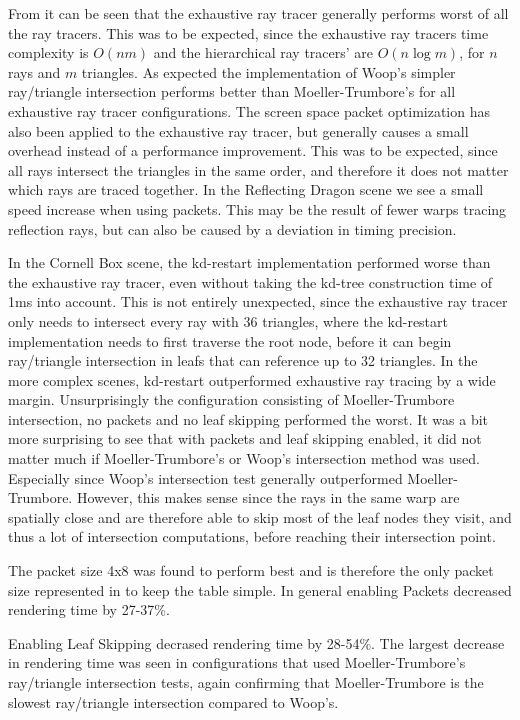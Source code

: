 From  it can be seen that the exhaustive ray
tracer generally performs worst of all the ray tracers. This was to be expected,
since the exhaustive ray tracers time complexity is $O(nm)$ and the hierarchical
ray tracers' are $O(n \log m)$, for $n$ rays and $m$ triangles. As expected the
implementation of Woop's simpler ray/triangle intersection performs better than
Moeller-Trumbore's for all exhaustive ray tracer configurations. The screen
space packet optimization has also been applied to the exhaustive ray tracer,
but generally causes a small overhead instead of a performance improvement. This
was to be expected, since all rays intersect the triangles in the same order,
and therefore it does not matter which rays are traced together. In the
Reflecting Dragon scene we see a small speed increase when using packets. This
may be the result of fewer warps tracing reflection rays, but can also be caused
by a deviation in timing precision.

In the Cornell Box scene, the kd-restart implementation performed worse than the
exhaustive ray tracer, even without taking the kd-tree construction time of 1ms
into account. This is not entirely unexpected, since the exhaustive ray tracer
only needs to intersect every ray with 36 triangles, where the kd-restart
implementation needs to first traverse the root node, before it can begin
ray/triangle intersection in leafs that can reference up to 32 triangles. In the
more complex scenes, kd-restart outperformed exhaustive ray tracing by a wide
margin. Unsurprisingly the configuration consisting of Moeller-Trumbore
intersection, no packets and no leaf skipping performed the worst. It was a bit
more surprising to see that with packets and leaf skipping enabled, it did not
matter much if Moeller-Trumbore's or Woop's intersection method was
used. Especially since Woop's intersection test generally outperformed
Moeller-Trumbore. However, this makes sense since the rays in the same warp are
spatially close and are therefore able to skip most of the leaf nodes they
visit, and thus a lot of intersection computations, before reaching their
intersection point.

The packet size 4x8 was found to perform best and is therefore the only packet
size represented in  to keep the table
simple. In general enabling Packets decreased rendering time by 27-37\%.

Enabling Leaf Skipping decrased rendering time by 28-54\%. The largest decrease
in rendering time was seen in configurations that used Moeller-Trumbore's
ray/triangle intersection tests, again confirming that Moeller-Trumbore is the
slowest ray/triangle intersection compared to Woop's.

